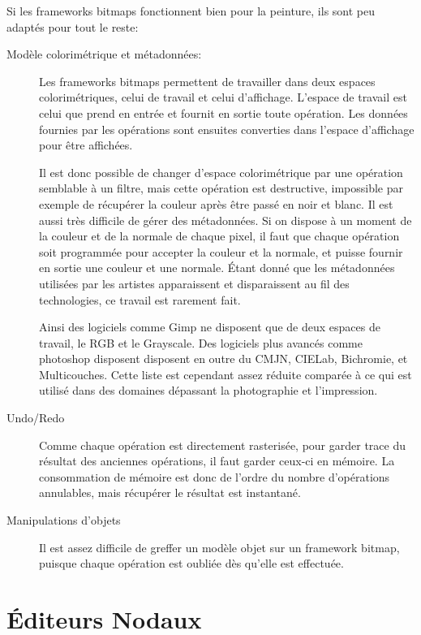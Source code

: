 		Si les frameworks bitmaps fonctionnent bien pour la peinture, ils sont peu adaptés pour tout le reste:
		\begin{description}
			\item[Modèle colorimétrique et métadonnées:] Les frameworks bitmaps permettent de travailler dans deux espaces colorimétriques,
			celui de travail et celui d'affichage. L'espace de travail est celui que prend en entrée et fournit en sortie toute opération.
			Les données fournies par les opérations sont ensuites converties dans l'espace d'affichage pour être affichées. 

			Il est donc possible de changer d'espace colorimétrique par une opération semblable à un filtre, mais cette opération est destructive,
			impossible par exemple de récupérer la couleur après être passé en noir et blanc. Il est aussi très difficile de gérer des métadonnées.
			Si on dispose à un moment de la couleur et de la normale de chaque pixel, il faut que chaque opération soit programmée pour accepter
			la couleur et la normale, et puisse fournir en sortie une couleur et une normale. Étant donné que les métadonnées utilisées par les
			artistes apparaissent et disparaissent au fil des technologies, ce travail est rarement fait. 

			Ainsi des logiciels comme Gimp ne disposent que de deux espaces de travail, le RGB et le Grayscale. Des logiciels plus avancés comme
			photoshop disposent disposent en outre du CMJN, CIELab, Bichromie, et Multicouches. Cette liste est cependant assez réduite comparée
			à ce qui est utilisé dans des domaines dépassant la photographie et l'impression.
			
			\item[Undo/Redo] Comme chaque opération est directement rasterisée, pour garder trace du résultat des anciennes opérations, il faut
			garder ceux-ci en mémoire. La consommation de mémoire est donc de l'ordre du nombre d'opérations annulables, mais récupérer le résultat
			est instantané.

			\item[Manipulations d'objets] Il est assez difficile de greffer un modèle objet sur un framework bitmap, puisque chaque opération est
			oubliée dès qu'elle est effectuée. 
		\end{description}







	\section{Éditeurs Nodaux}
